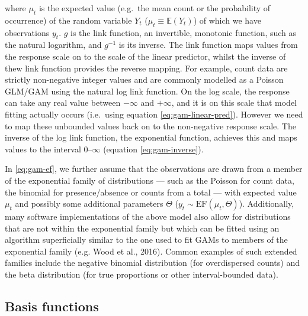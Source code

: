 \documentclass[12pt,]{article}
\begin{document}
where \(\mu_t\) is the expected value (e.g.~the mean count or the
probability of occurrence) of the random variable \(Y_t\)
(\(\mu_t \equiv \mathbb{E}(Y_t)\)) of which we have observations
\(y_t\). \(g\) is the link function, an invertible, monotonic function,
such as the natural logarithm, and \(g^{-1}\) is its inverse. The link
function maps values from the response scale on to the scale of the
linear predictor, whilst the inverse of thew link function provides the
reverse mapping. For example, count data are strictly non-negative
integer values and are commonly modelled as a Poisson GLM/GAM using the
natural log link function. On the log scale, the response can take any
real value between \(-\infty\) and \(+\infty\), and it is on this scale
that model fitting actually occurs (i.e.~using equation
\eqref{eq:gam-linear-pred}). However we need to map these unbounded
values back on to the non-negative response scale. The inverse of the
log link function, the exponential function, achieves this and maps
values to the interval 0--\(\infty\) (equation \eqref{eq:gam-inverse}).

In \eqref{eq:gam-ef}, we further assume that the observations are drawn
from a member of the exponential family of distributions --- such as the
Poisson for count data, the binomial for presence/absence or counts from
a total --- with expected value \(\mu_t\) and possibly some additional
parameters \(\Theta\) (\(y_t \sim \text{EF}(\mu_t, \Theta)\)).
Additionally, many software implementations of the above model also
allow for distributions that are not within the exponential family but
which can be fitted using an algorithm superficially similar to the one
used to fit GAMs to members of the exponential family (e.g. Wood et al.,
2016). Common examples of such extended families include the negative
binomial distribution (for overdispersed counts) and the beta
distribution (for true proportions or other interval-bounded data).

\subsection{Basis functions}\label{basis-functions}
\end{document}
